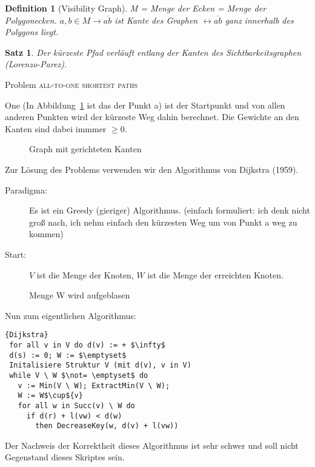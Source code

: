 \documentclass[ngerman,draft,parskip=half*,twoside]{scrreprt}
\theoremstyle{break}
\newtheorem{definition}{Definition}
\newtheorem{satz}{Satz}
\begin{document}
\begin{definition}[Visibility Graph]
M = Menge der Ecken = Menge der Polygonecken.
$a, b \in M \rightarrow \overline{ab}$ ist Kante des Graphen $\leftrightarrow \overline{ab}$ ganz innerhalb des Polygons liegt.
\end{definition}

\begin{satz}
Der kürzeste Pfad verläuft entlang der Kanten des Sichtbarkeitsgraphen (Lorenzo-Parez).
\end{satz}
Problem \textsc{all-to-one shortest paths}

One (In Abbildung~\ref{121103d} ist das der Punkt a) ist der Startpunkt und von allen anderen
Punkten wird der kürzeste Weg dahin berechnet.
Die Gewichte an den Kanten sind dabei immmer $\geq 0$.

\begin{figure}[ht]
  \centering
  \caption{Graph mit gerichteten Kanten}
  \label{121103d}
\end{figure}

Zur Lösung des Problems verwenden wir den Algorithmus von Dijkstra (1959).

\begin{description}
\item[Paradigma: ] Es ist ein Greedy (gieriger) Algorithmus.
(einfach formuliert: ich denk nicht groß nach, ich nehm einfach den kürzesten Weg um von Punkt a weg zu kommen)
\item[Start: ] $V$ ist die Menge der Knoten, $W$ ist die Menge der erreichten Knoten.
\end{description}

\begin{figure}[H]
  \centering
  \caption{Menge W wird aufgeblasen}
  \label{121103e}
\end{figure}
Nun zum eigentlichen Algorithmus:

\begin{Algorithmus}[ht]
\begin{lstlisting}[frame=tlrb, mathescape=true, title=\textsc{Dijkstra}, gobble=1]{Dijkstra}
 for all v in V do d(v) := + $\infty$
 d(s) := 0; W := $\emptyset$
 Initalisiere Struktur V (mit d(v), v in V)
 while V \ W $\not= \emptyset$ do
   v := Min(V \ W); ExtractMin(V \ W);
   W := W$\cup${v}
   for all w in Succ(v) \ W do
     if d(r) + l(vw) < d(w)
       then DecreaseKey(w, d(v) + l(vw))
\end{lstlisting}

Der Nachweis der Korrektheit dieses Algorithmus ist sehr schwer und soll nicht Gegenstand
dieses Skriptes sein.
\end{Algorithmus}   %
\end{document}
